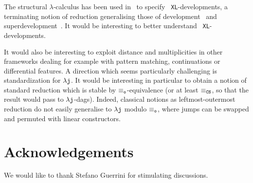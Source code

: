\documentclass{LMCS}
\renewcommand{\>}{\rightarrow}
\def\lam{\lambda}
\newcommand{\dis}{{\tt j}}
\newcommand{\lj}{\lam{\dis}}
\newcommand{\CS}{{\tt CS}}
\newcommand{\eqo}{\equiv_\osym}
\newcommand{\osym}{{\tt o}}
\newcommand{\eqcs}{\equiv_\CS}
\begin{document}
The  structural $\lam$-calculus  has   been  used in~\cite{AK10}  to  specify  {\tt
  XL}-developments,  a terminating  notion  of reduction  generalising
those           of           development~\cite{Hindley78}          and
superdevelopment~\cite{KvOvR93}. It would be interesting to better understand {\tt
  XL}-developments.

It would also be interesting to exploit distance and multiplicities in
other frameworks dealing  for example with pattern matching,
continuations  or  differential  features.   A direction  which  seems
particularly  challenging is standardization
for $\lj$. It  would be interesting  in particular to obtain  a
notion    of     standard    reduction   which     is    stable    by
$\eqo$-equivalence (or  at least  $\eqcs$, so that  the result
would    pass   to   $\lj$-dags).   Indeed,
classical  notions as leftmost-outermost  reduction do
not  easily generalise  to $\lj$  modulo $\eqo$, where  jumps can  be
swapped and permuted with linear constructors.



\section*{Acknowledgements}
We would like to thank Stefano Guerrini
for stimulating discussions.



\end{document}
